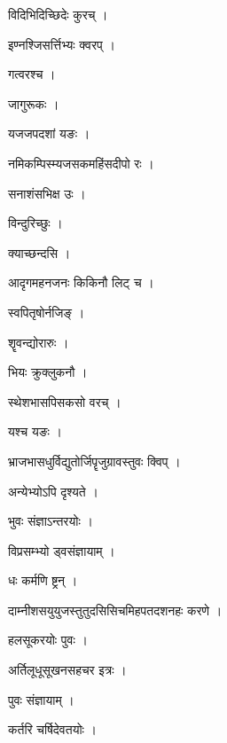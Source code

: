 \documentclass[10pt, openany]{book}
\begin{document}
\noindent विदिभिदिच्छिदेः कुरच् ।

\noindent इण्नश्जिसर्त्तिभ्यः क्वरप् ।

\noindent गत्वरश्च ।

\noindent जागुरूकः ।

\noindent यजजपदशां यङः ।

\noindent नमिकम्पिस्म्यजसकमहिंसदीपो रः ।

\noindent सनाशंसभिक्ष उः ।

\noindent विन्दुरिच्छुः ।

\noindent क्याच्छन्दसि ।

\noindent आदृगमहनजनः किकिनौ लिट् च ।

\noindent स्वपितृषोर्नजिङ् ।

\noindent शॄवन्द्योरारुः ।

\noindent भियः क्रुक्लुकनौ ।

\noindent स्थेशभासपिसकसो वरच् ।

\noindent यश्च यङः ।

\noindent भ्राजभासधुर्विद्युतोर्जिपॄजुग्रावस्तुवः क्विप् ।

\noindent अन्येभ्योऽपि दृश्यते ।

\noindent भुवः संज्ञाऽन्तरयोः ।

\noindent विप्रसम्भ्यो ड्वसंज्ञायाम् ।

\noindent धः कर्मणि ष्ट्रन् ।

\noindent दाम्नीशसयुयुजस्तुतुदसिसिचमिहपतदशनहः करणे ।

\noindent हलसूकरयोः पुवः ।

\noindent अर्तिलूधूसूखनसहचर इत्रः ।

\noindent पुवः संज्ञायाम् ।

\noindent कर्तरि चर्षिदेवतयोः ।
\end{document}
